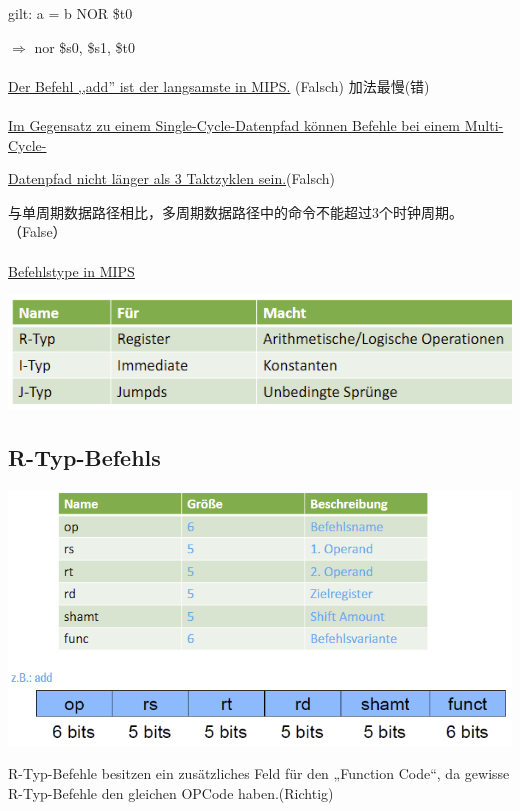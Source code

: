 \documentclass[fleqn]{article}
\begin{document}
\indent\indent gilt: \quad a = b NOR \$t0

\indent\indent $\Rightarrow$ nor \$s0, \$s1, \$t0
\\
\\
\noindent\underline{Der Befehl ,,add'' ist der langsamste in MIPS.} (Falsch) 加法最慢(错)
\\
\\
\noindent\underline{Im Gegensatz zu einem Single-Cycle-Datenpfad können Befehle bei einem Multi-Cycle-}

\underline{Datenpfad nicht länger als 3 Taktzyklen sein.}(Falsch)

与单周期数据路径相比，多周期数据路径中的命令不能超过3个时钟周期。（False）
\\
\\
\noindent\underline{Befehlstype in MIPS}

\begin{center}
    \includegraphics[scale=0.5]{25.png}
\end{center}

\subsection{R-Typ-Befehls}

\begin{center}
    \includegraphics[scale=0.5]{26.png}
\end{center}

R-Typ-Befehle besitzen ein zusätzliches Feld für den „Function Code“, da gewisse R-Typ-Befehle den gleichen OPCode haben.(Richtig)
\end{document}
